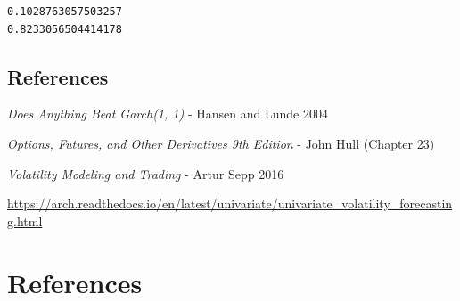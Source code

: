\documentclass[
  letterpaper,
  DIV=11,
  numbers=noendperiod]{scrreprt}
\newlength{\cslhangindent}
\newlength{\cslentryspacingunit} %
\newenvironment{CSLReferences}[2] %
 {%
  \setlength{\parindent}{0pt}
  \ifodd #1
  \let\oldpar\par
  \def\par{\hangindent=\cslhangindent\oldpar}
  \fi
  \setlength{\parskip}{#2\cslentryspacingunit}
 }%
 {}
\begin{document}
\begin{verbatim}
0.1028763057503257
0.8233056504414178
\end{verbatim}

\hypertarget{references}{%
\section{References}\label{references}}

\emph{Does Anything Beat Garch(1, 1)} - Hansen and Lunde 2004

\emph{Options, Futures, and Other Derivatives 9th Edition} - John Hull
(Chapter 23)

\emph{Volatility Modeling and Trading} - Artur Sepp 2016

\url{https://arch.readthedocs.io/en/latest/univariate/univariate_volatility_forecasting.html}


\hypertarget{references-1}{%
\chapter*{References}\label{references-1}}


\hypertarget{refs}{}
\begin{CSLReferences}{0}{0}
\end{CSLReferences}
\end{document}
